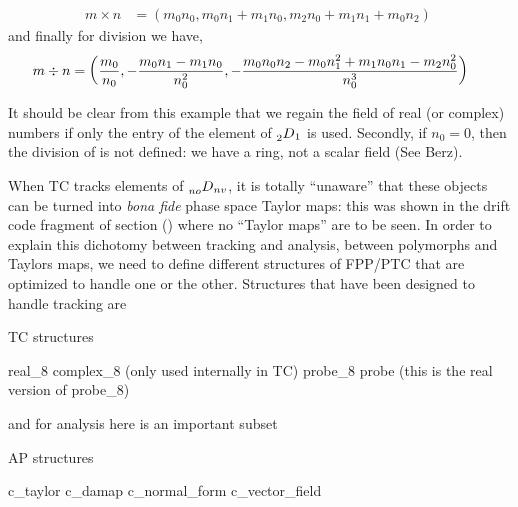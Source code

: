 \documentclass{hitec}     %
\begin{document}
\begin{align}m\times n&=\left({{m}_{0}{n}_{0},{m}_{0}{n}_{1}+{m}_{1}{n}_{0},{m}_{2}{n}_{0}+{m}_{1}{n}_{1}+{m}_{0}{n}_{2}}\right)\ \label{eq:nodnvpmul}\end{align}
and finally for division we have,
%
\begin{align}m\div n&=\left({{{m}_{0} \over {n}_{0}},-{{m}_{0}{n}_{1}-{m}_{1}{n}_{0} \over {n}_{0}^{2}},-{{m}_{0}{n}_{0}{n}_{2}-{m}_{0}{n}_{1}^{2}+{m}_{1}{n}_{0}{n}_{1}-{m}_{2}{n}_{0}^{2} \over {n}_{0}^{3}}}\right)\ \label{eq:nodnvpdiv}\end{align}

It should be clear from this example that we regain the field of real (or complex) numbers if only the entry of the element of $\prescript{}{2}{D}_{1}$ is used. Secondly, if $n_0 = 0$, then the division of  is not defined: we have a ring, not a scalar field (See Berz\cite{theberzbook}).


When  TC tracks elements of $ \prescript{}{no}{D}_{nv} $, it is totally ``unaware'' that these objects can be turned into {\it bona fide} phase space Taylor maps: this was shown in the drift code fragment of section () where no ``Taylor maps'' are to be seen. In  
order to explain this dichotomy between tracking and analysis, between polymorphs and Taylors maps, we need to  define  different structures of FPP/PTC that
are optimized to handle one or the other. 
Structures that have been designed to handle tracking are
\begin{code}
TC structures

real_8
complex_8    (only used internally in TC)
probe_8
probe    (this is the real version of probe_8)
\end{code}

and for analysis here is an important subset  

\begin{code}
AP structures

c_taylor
c_damap
c_normal_form
c_vector_field
\end{code}
\end{document}
